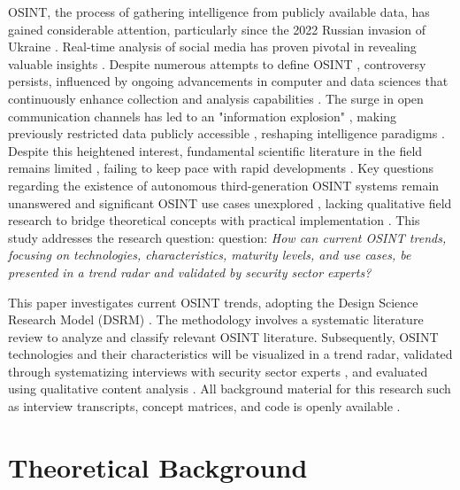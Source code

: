 \documentclass[10pt]{article}
\begin{document}
OSINT, the process of gathering intelligence from publicly available data, has gained considerable attention, particularly since
the 2022 Russian invasion of Ukraine \cite{DosPassos.2017}. Real-time analysis of social media has proven pivotal in revealing
valuable insights \cite{SmithBoyle.24.07.2023}. Despite numerous attempts to define OSINT
\cite{Hwang.2022, PastorGalindo.2020, Yogish.2021}, controversy persists, influenced by ongoing advancements in computer and
data sciences that continuously enhance collection and analysis capabilities \cite{Ghioni.2023, Williams.2018}.
The surge in open communication channels has led to an "information explosion" \cite{DosPassos.2017, Hwang.2022, Yogish.2021},
making previously restricted data publicly accessible \cite{Hwang.2022, Williams.2018}, reshaping intelligence paradigms \cite{Dokman.2020}.
Despite this heightened interest, fundamental scientific literature in the field remains limited \cite{HerreraCubides.2020},
failing to keep pace with rapid developments \cite{Ghioni.2023, Williams.2018}. Key questions regarding the existence of
autonomous third-generation OSINT systems \cite{PastorGalindo.2019, PastorGalindo.2020} remain unanswered
\cite{Ghioni.2023, PastorGalindo.2020, Yogish.2021} and significant OSINT use cases unexplored
\cite{AlKilani.2021, Dokman.2020, Ghioni.2023}, lacking qualitative field research to bridge theoretical concepts with
practical implementation \cite{HerreraCubides.2020, PastorGalindo.2019}. This study addresses the research question:
question: \textit{How can current OSINT trends, focusing on technologies, characteristics, maturity levels, and use cases,
    be presented in a trend radar and validated by security sector experts?}


This paper investigates current OSINT trends, adopting the Design Science Research Model (DSRM) \cite{Peffers.2007}.
The methodology involves a systematic literature review \cite{Webster.2002} to analyze and classify relevant OSINT literature.
Subsequently, OSINT technologies and their characteristics will be visualized in a trend radar, validated through systematizing
interviews with security sector experts \cite{Bogner.2014}, and evaluated using qualitative content analysis \cite{Billings.1997}. All background material for this research such as interview transcripts, concept matrices, and code is openly available \cite{kayser2024}.


\section{Theoretical Background} \label{sec:theoreticalbackground}
\end{document}
